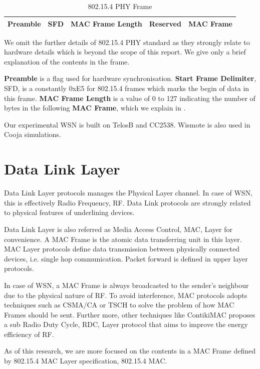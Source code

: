 \begin{table}[h!]
	\centering
	\begin{tabular}{|c|c|c|c|c|}
		\hline
		Preamble & SFD & MAC Frame Length & Reserved & MAC Frame\\ \hline
	\end{tabular}
	\caption{802.15.4 PHY Frame}
	\label{Fig: 802.15.4 PHY Frame}
\end{table}

We omit the further details of 802.15.4 PHY standard as they strongly relate to hardware details which is beyond the scope of this report. We give only a brief explanation of the contents in the frame.

\textbf{Preamble} is a flag used for hardware synchronisation. \textbf{Start Frame Delimiter}, SFD, is a constantly 0xE5 for 802.15.4 frames which marks the begin of data in this frame. \textbf{MAC Frame Length} is a value of 0 to 127 indicating the number of bytes in the following \textbf{MAC Frame}, which we explain in .

Our experimental WSN is built on TelosB\cite{TelosB} and CC2538\cite{CC2538}. Wismote\cite{Wismote} is also used in Cooja simulations.

\section{Data Link Layer} \label{Sec: Data Link Layer}
Data Link Layer protocols manages the Physical Layer channel. In case of WSN, this is effectively Radio Frequency, RF. Data Link protocols are strongly related to physical features of underlining devices. 

Data Link Layer is  also referred as Media Access Control, MAC, Layer for convenience. A MAC Frame is the atomic data transferring unit in this layer. MAC Layer protocols define data transmission between physically connected devices, i.e. single hop communication. Packet forward is defined in upper layer protocols.

In case of WSN, a MAC Frame is always broadcasted to the sender’s neighbour due to the physical nature of RF. To avoid interference, MAC protocols adopts  techniques such as CSMA/CA \cite{802154} or TSCH\cite{TSCH} to solve the problem of how MAC Frames should be sent. Further more, other techniques like ContikiMAC\cite{ContikiMAC} proposes a sub Radio Duty Cycle, RDC, Layer protocol that aims to improve the energy efficiency of RF.

As of this research, we are more focused on the contents in a MAC Frame defined by 802.15.4 MAC Layer specification\cite{802154}, 802.15.4 MAC.

